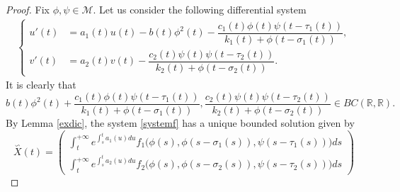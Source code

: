 \documentclass[[a4paper,10pt]{article}
\newcommand{\R}{\mathbb{R}}
\begin{document}
\begin{proof}
  \quad Fix $\phi,\psi\in \mathcal{M}$. Let us consider the following differential system
  {\small \begin{align}\label{systemf}
\left \{\begin{aligned}
  u'(t)&=a_1(t)u(t)-b(t)\phi^2(t)-\dfrac{c_1(t)\phi(t)\psi(t-\tau_1(t))}{k_1(t)+\phi(t-\sigma_1(t))},\\
   v'(t)&=a_2(t)v(t)-\dfrac{c_2(t)\psi(t)\psi(t-\tau_2(t))}{k_2(t)+\phi(t-\sigma_2(t))}.
  \end{aligned}\right. 
\end{align} }
 It is clearly   that   {\small $$b(t)\phi^2(t)+\dfrac{c_1(t)\phi(t)\psi(t-\tau_1(t))}{k_1(t)+\phi(t-\sigma_1(t))}, \dfrac{c_2(t)\psi(t)\psi(t-\tau_2(t))}{k_2(t)+\phi(t-\sigma_2(t))} \in BC(\R,\R).$$ }
By Lemma \ref{exdic}, the system  \eqref{systemf} has a unique bounded solution given by
\[ \overset{\backsim}{X}(t)=\left (\begin{matrix}
\displaystyle \int^{+\infty}_{t} e^{\int^t_s a_1(u)du}f_1\big(\phi(s),\phi(s-\sigma_1(s)),\psi(s-\tau_1(s))\big)ds\\
\displaystyle \int^{+\infty}_{t} e^{\int^t_s a_2(u)du}f_2\big(\phi(s),\phi(s-\sigma_2(s)),\psi(s-\tau_2(s))\big)ds
\end{matrix}
\right)\]


\end{proof}
\end{document}
